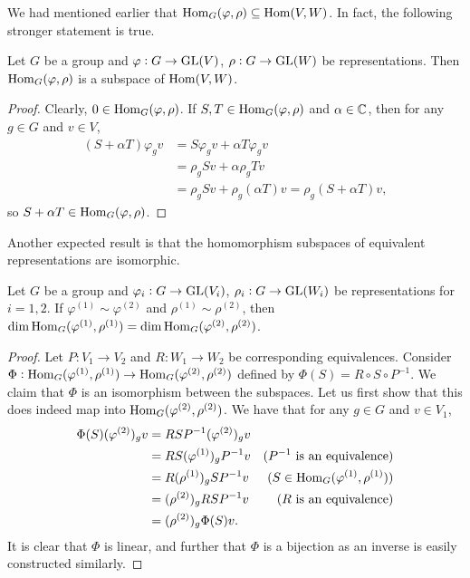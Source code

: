 		We had mentioned earlier that $\operatorname{Hom}_G(\varphi,\rho) \subseteq \operatorname{Hom}(V,W)$. In fact, the following stronger statement is true.

		\begin{fprop}
			\label{prop: hom is a subspace}
			Let $G$ be a group and $\varphi : G \to \operatorname{GL}(V)$, $\rho : G \to \operatorname{GL}(W)$ be representations. Then $\operatorname{Hom}_G(\varphi,\rho)$ is a subspace of $\operatorname{Hom}(V,W)$.
		\end{fprop}
		\begin{proof}
			Clearly, $0 \in \operatorname{Hom}_G(\varphi,\rho)$. If $S,T \in \operatorname{Hom}_G(\varphi,\rho)$ and $\alpha \in \mathbb{C}$, then for any $g \in G$ and $v \in V$,
			\begin{align*}
				(S + \alpha T) \varphi_g v &= S \varphi_g v + \alpha T \varphi_g v \\
					&= \rho_g S v + \alpha \rho_g T v \\
					&= \rho_g S v + \rho_g (\alpha T) v = \rho_g (S + \alpha T) v, 
			\end{align*}
			so $S + \alpha T \in \operatorname{Hom}_G(\varphi,\rho)$.
		\end{proof}

		Another expected result is that the homomorphism subspaces of equivalent representations are isomorphic.

		\begin{prop}
			\label{prop: homs of equivalent are isomorphic}
			Let $G$ be a group and $\varphi_i : G \to \operatorname{GL}(V_i)$, $\rho_i : G \to \operatorname{GL}(W_i)$ be representations for $i = 1,2$. If $\varphi^{(1)} \sim \varphi^{(2)}$ and $\rho^{(1)} \sim \rho^{(2)}$, then $\dim \operatorname{Hom}_G(\varphi^{(1)},\rho^{(1)}) = \dim \operatorname{Hom}_G(\varphi^{(2)},\rho^{(2)})$.
		\end{prop}
		\begin{proof}
			Let $P : V_1 \to V_2$ and $R : W_1 \to W_2$ be corresponding equivalences. Consider $\Phi : \operatorname{Hom}_G (\varphi^{(1)},\rho^{(1)}) \to \operatorname{Hom}_G (\varphi^{(2)},\rho^{(2)})$ defined by $\Phi(S) = R \circ S \circ P^{-1}$. We claim that $\Phi$ is an isomorphism between the subspaces. Let us first show that this does indeed map into $\operatorname{Hom}_G(\varphi^{(2)},\rho^{(2)})$. We have that for any $g \in G$ and $v \in V_1$,
			\begin{align*}
				\Phi(S) (\varphi^{(2)})_g v &= R S P^{-1} (\varphi^{(2)})_g v \\
					&= R S (\varphi^{(1)})_g P^{-1} v & \text{($P^{-1}$ is an equivalence)} \\
					&= R (\rho^{(1)})_g S P^{-1} v & (S \in \operatorname{Hom}_G(\varphi^{(1)},\rho^{(1)})) \\
					&= (\rho^{(2)})_g R S P^{-1} v & \text{($R$ is an equivalence)} \\
					&= (\rho^{(2)})_g \Phi(S) v.
			\end{align*}
			It is clear that $\Phi$ is linear, and further that $\Phi$ is a bijection as an inverse is easily constructed similarly.
		\end{proof}

